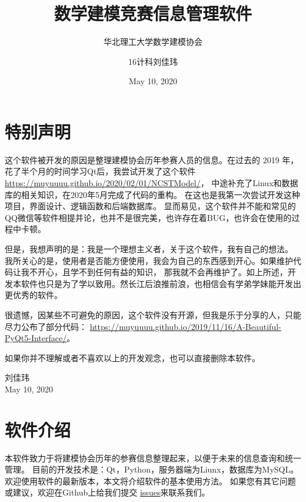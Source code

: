 \documentclass[cn,11pt,chinese, hazy]{elegantbook}
\title{数学建模竞赛信息管理软件}
\subtitle{华北理工大学数学建模协会}
\author{16计科刘佳玮}
\date{May 10, 2020}
\begin{document}
\maketitle
\frontmatter

\chapter*{特别声明}

这个软件被开发的原因是整理建模协会历年参赛人员的信息。在过去的 2019 年，花了半个月的时间学习Qt后，我尝试开发了这个软件
 \href{https://muyuuuu.github.io/2020/02/01/NCSTModel/}{https://muyuuuu.github.io/2020/02/01/N\-CSTModel/}，
中途补充了Linux和数据库的相关知识，在2020年5月完成了代码的重构。
在这也是我第一次尝试开发这种项目，界面设计、逻辑函数和后端数据库。
显而易见，这个软件并不能和常见的QQ微信等软件相提并论，也并不是很完美，也许存在着BUG，也许会在使用的过程中卡顿。

但是，我想声明的是：我是一个理想主义者，关于这个软件，我有自己的想法。
我所关心的是，使用者是否能方便使用，我会为自己的东西感到开心。如果维护代码让我不开心，且学不到任何有益的知识，
那我就不会再维护了。如上所述，开发本软件也只是为了学以致用。然长江后浪推前浪，也相信会有学弟学妹能开发出更优秀的软件。

很遗憾，因某些不可避免的原因，这个软件没有开源，但我是乐于分享的人，只能尽力公布了部分代码：
\href{https://muyuuuu.github.io/2019/11/16/A-Beautiful-PyQt5-Interface/}{https://muyuuuu.github.io/2019/11/16/A-Beautiful-PyQt5-Interface/}。

如果你并不理解或者不喜欢以上的开发观念，也可以直接删除本软件。

\vskip 1.5cm

\begin{flushright}
刘佳玮\\
May 10, 2020
\end{flushright}

\tableofcontents

\mainmatter
\chapter{软件介绍}

本软件致力于将建模协会历年的参赛信息整理起来，以便于未来的信息查询和统一管理。
目前的开发技术是：Qt，Python，服务器端为Liunx，数据库为MySQL。欢迎使用软件的最新版本，本文将介绍软件的基本使用方法。
如果您有其它问题或建议，欢迎在Github上给我们提交
 \href{https://github.com/muyuuuu/NCST-MMA-Contest-Management-System-Public}{issues}来联系我们。
\end{document}
